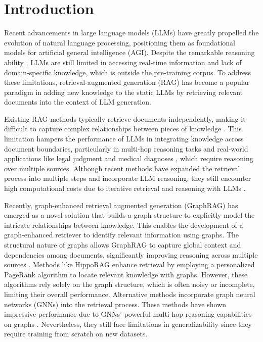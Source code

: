 \section{Introduction}\label{sec:introduction}

Recent advancements in large language models (LLMs) \citep{gpt4o,llama3,qwen2} have greatly propelled the evolution of natural language processing, positioning them as foundational models for artificial general intelligence (AGI). Despite the remarkable reasoning ability \citep{openai_o1}, LLMs are still limited in accessing real-time information and lack of domain-specific knowledge, which is outside the pre-training corpus. To address these limitations, retrieval-augmented generation (RAG) \citep{gao2023retrieval} has become a popular paradigm in adding new knowledge to the static LLMs by retrieving relevant documents into the context of LLM generation. 

Existing RAG methods typically retrieve documents independently, making it difficult to capture complex relationships between pieces of knowledge \citep{karpukhin2020dense,bge_m3,moreira2024nv}. This limitation hampers the performance of LLMs in integrating knowledge across document boundaries, particularly in multi-hop reasoning tasks \citep{yang2018hotpotqa,trivedi2022musique} and real-world applications like legal judgment \citep{kang2024bridging} and medical diagnoses \citep{jin-etal-2019-pubmedqa}, which require reasoning over multiple sources. Although recent methods have expanded the retrieval process into multiple steps and incorporate LLM reasoning, they still encounter high computational costs due to iterative retrieval and reasoning with LLMs \citep{trivedi2023interleaving,sunthink,joshi2024reaper}.

Recently, graph-enhanced retrieval augmented generation (GraphRAG) \citep{peng2024graph,han2024retrieval} has emerged as a novel solution that builds a graph structure to explicitly model the intricate relationships between knowledge. This enables the development of a graph-enhanced retriever to identify relevant information using graphs. The structural nature of graphs allows GraphRAG to capture global context and dependencies among documents, significantly improving reasoning across multiple sources \citep{edge2024local}. 
Methods like HippoRAG \citep{gutiérrez2024hipporag} enhance retrieval by employing a personalized PageRank algorithm to locate relevant knowledge with graphs. However, these algorithms rely solely on the graph structure, which is often noisy or incomplete, limiting their overall performance.
Alternative methods \citep{mavromatis2024gnn,he2024g} incorporate graph neural networks (GNNs) into the retrieval process. These methods have shown impressive performance due to GNNs' powerful multi-hop reasoning capabilities on graphs \citep{yasunaga2021qa}. Nevertheless, they still face limitations in generalizability since they require training from scratch on new datasets.

